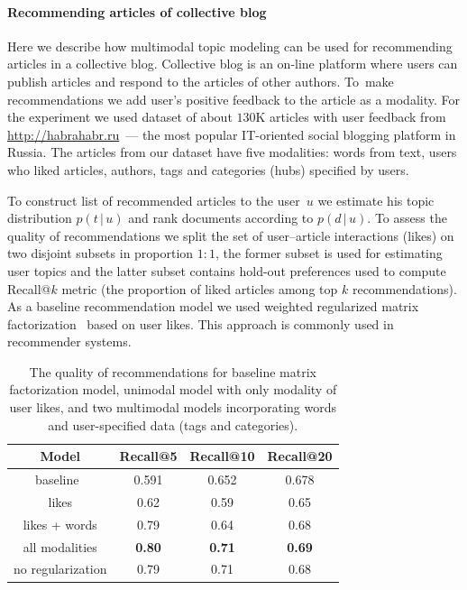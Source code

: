 \documentclass{acm_proc_article-sp}
\newcommand{\cond}{\mspace{3mu}{|}\mspace{3mu}}
\begin{document}
\paragraph{Recommending articles of collective blog}

Here we describe how multimodal topic modeling can be used for recommending articles in a collective blog.
Collective blog is an on-line platform where users can publish articles and respond to the articles of other authors.
To~make recommendations we add user's positive feedback to the article as a  modality.
For the experiment we used dataset of about $130$K articles with user feedback from \url{http://habrahabr.ru}~---
the most popular IT-oriented social blogging platform in Russia.
The articles from our dataset have five modalities:
words from text, users who liked articles, authors, tags and categories (hubs) specified by users.

To construct list of recommended articles to the user~$u$
we estimate his topic distribution $p(t\cond u)$ and rank documents according to $p(d\cond u)$.
To assess the quality of recommendations
we split the set of user--article interactions (likes) on two disjoint subsets in proportion $1:1$,
the former subset is used for estimating user topics and
the latter subset contains hold-out preferences used to compute Recall@$k$ metric
(the proportion of liked articles among top $k$ recommendations).
As a baseline recommendation model we used weighted regularized matrix factorization~\cite{hu08ials} based on user likes.
This approach is commonly used in recommender systems.

\begin{table}[t]
	\caption{
    The quality of recommendations for baseline matrix factorization model,
    unimodal model with only modality of user likes, and
    two multimodal models incorporating words and user-specified data (tags and categories).
	}
	\label{tab:habrahabr_recommendation_comparison}
    \centering\tabcolsep=4.3pt
	\begin{tabular}[t]{c|c|c|c}
	\hline
	Model & Recall@5 & Recall@10 & Recall@20 \\
	\hline
	baseline~\cite{hu08ials} & 0.591 & 0.652 & 0.678 \\
	likes & 0.62 & 0.59 & 0.65 \\
	likes + words & 0.79 & 0.64 & 0.68 \\
	all modalities & \bfseries{0.80} & \bfseries{0.71} & \bfseries{0.69} \\
	no regularization & 0.79 & 0.71 & 0.68 \\
	\hline
	\end{tabular}
\end{table}
\end{document}
